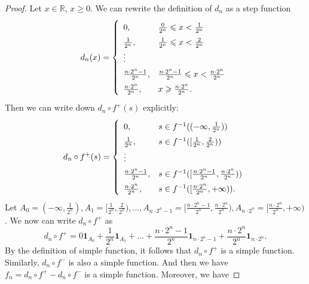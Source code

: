 \documentclass[a4paper, linespread=1.5]{article}
\newcommand{\Real}{\mathbb{R}}
\newcommand{\IndicatorFunc}[1]{\mathbf{1}_{#1}}
\begin{document}
    \begin{proof}
        Let $x \in \Real$, $x \geqslant 0$. We can rewrite the definition of $d_n$ as a step function
        \begin{align*}
            d_n(x) = \left\{
            \def\arraystretch{1.5}
            \begin{array}{ll}
                0, &\frac{0}{2^n} \leqslant x < \frac{1}{2^n} \\
                \frac{1}{2^n}, & \frac{1}{2^n} \leqslant x < \frac{2}{2^n} \\
                \vdots & \\
                \frac{n \cdot 2^n - 1}{2^n}, & \frac{n \cdot 2^n - 1}{2^n} \leqslant x < \frac{n \cdot 2^n}{2^n} \\
                \frac{n \cdot 2^n}{2^n}, & x \geqslant \frac{n \cdot 2^n}{2^n}.
            \end{array}
            \right.
        \end{align*}
        Then we can write down $d_n \circ f^+(s)$ explicitly:
        \begin{align*}
            d_n \circ f^+(s) = \left\{
            \def\arraystretch{1.5}
            \begin{array}{ll}
                0, & s \in f^{-1}((-\infty, \frac{1}{2^n})) \\
                \frac{1}{2^n}, & s \in f^{-1}([\frac{1}{2^n},  \frac{2}{2^n})) \\
                \vdots & \\
                \frac{n \cdot 2^n - 1}{2^n}, & s \in f^{-1}([\frac{n \cdot 2^n - 1}{2^n}, \frac{n \cdot 2^n}{2^n})) \\
                \frac{n \cdot 2^n}{2^n}, & s \in f^{-1}([\frac{n \cdot 2^n}{2^n}, +\infty)).
            \end{array}
            \right.
        \end{align*}
        Let $A_0 = (-\infty, \frac{1}{2^n}), A_1 = [\frac{1}{2^n}, \frac{2}{2^n}), \ldots, A_{n \cdot 2^n - 1} = [\frac{n \cdot 2^n - 1}{2^n}, \frac{n \cdot 2^n}{2^n}), A_{n \cdot 2^n} = [\frac{n \cdot 2^n}{2^n}, +\infty)$. We now can write $d_n \circ f^+$ as
        $$
        d_n \circ f^+ = 0\IndicatorFunc{A_0} + \frac{1}{2^n}\IndicatorFunc{A_1} + \ldots + \frac{n \cdot 2^n - 1}{2^n}\IndicatorFunc{n \cdot 2^n - 1} + \frac{n \cdot 2^n}{2^n}\IndicatorFunc{n \cdot 2^n}.
        $$
        By the definition of simple function, it follows that $d_n \circ f^+$ is a simple function. Similarly, $d_n \circ f^-$ is also a simple function. And then we have $f_n = d_n \circ f^+ - d_n \circ f^-$ is a simple function. Moreover, we have

\end{proof}
\end{document}
